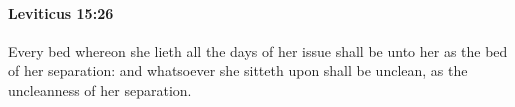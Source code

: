 
		\paragraph{Leviticus 15:26} %
			\label{LEVITICUS-15-26}

			Every bed whereon she lieth all the days of her issue shall be unto her as the bed of her separation: and whatsoever she sitteth upon shall be unclean, as the uncleanness of her separation.


